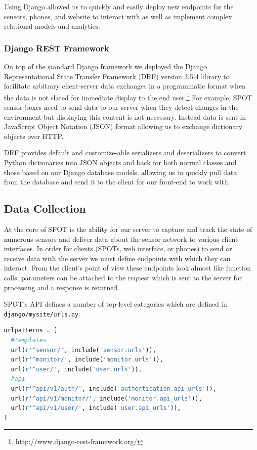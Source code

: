 Using Django allowed us to quickly and easily deploy new endpoints for the sensors, phones, and website to interact with as well as implement complex relational models and analytics.



\subsubsection{Django REST Framework} %
On top of the standard Django framework we deployed the Django Representational State Transfer Framework (DRF) version 3.5.4 library to facilitate arbitrary client-server data exchanges in a programmatic format when the data is not slated for immediate display to the end user.\footnote{http://www.django-rest-framework.org/}
For example, SPOT sensor boxes need to send data to our server when they detect changes in the environment but displaying this content is not necessary.
Instead data is sent in JavaScript Object Notation (JSON) format allowing us to exchange dictionary objects over HTTP.

DRF provides default and customize-able serializers and deserializers to convert Python dictionaries into JSON objects and back for both normal classes and those based on our Django database models, allowing us to quickly pull data from the database and send it to the client for our front-end to work with.


\subsection{Data Collection}
At the core of SPOT is the ability for our server to capture and track the state of numerous sensors and deliver data about the sensor network to various client interfaces.
In order for clients (SPOTs, web interface, or phones) to send or receive data with the server we must define endpoints with which they can interact.  
From the client's point of view these endpoints look almost like function calls; parameters can be attached to the request which is sent to the server for processing and a response is returned.

SPOT's API defines a number of top-level categories which are defined in \verb|django/mysite/urls.py|:
\begin{lstlisting}[language=Python]
urlpatterns = [
  #templates
  url(r'^sensor/', include('sensor.urls')),
  url(r'^monitor/', include('monitor.urls')),
  url(r'^user/', include('user.urls')),
  #api
  url(r'^api/v1/auth/', include('authentication.api_urls')),
  url(r'^api/v1/monitor/', include('monitor.api_urls')),
  url(r'^api/v1/user/', include('user.api_urls')),
]
\end{lstlisting}

